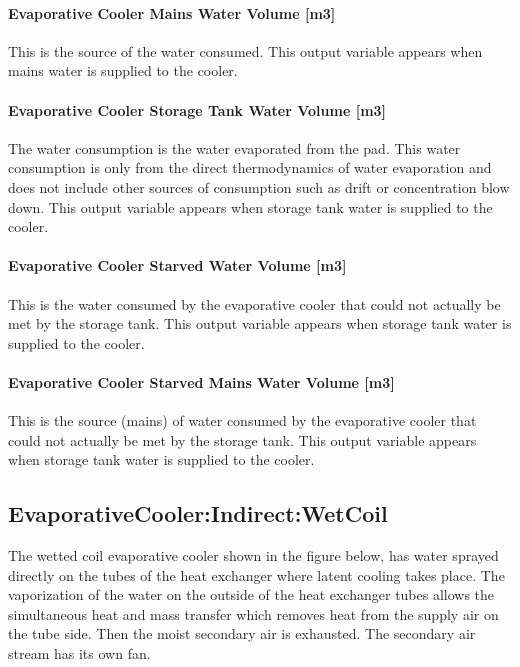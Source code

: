 \paragraph{Evaporative Cooler Mains Water Volume {[}m3{]}}\label{evaporative-cooler-mains-water-volume-m3-2}

This is the source of the water consumed. This output variable appears when mains water is supplied to the cooler.

\paragraph{Evaporative Cooler Storage Tank Water Volume {[}m3{]}}\label{evaporative-cooler-storage-tank-water-volume-m3-2}

The water consumption is the water evaporated from the pad. This water consumption is only from the direct thermodynamics of water evaporation and does not include other sources of consumption such as drift or concentration blow down. This output variable appears when storage tank water is supplied to the cooler.

\paragraph{Evaporative Cooler Starved Water Volume {[}m3{]}}\label{evaporative-cooler-starved-water-volume-m3-2}

This is the water consumed by the evaporative cooler that could not actually be met by the storage tank. This output variable appears when storage tank water is supplied to the cooler.

\paragraph{Evaporative Cooler Starved Mains Water Volume {[}m3{]}}\label{evaporative-cooler-starved-mains-water-volume-m3-2}

This is the source (mains) of water consumed by the evaporative cooler that could not actually be met by the storage tank. This output variable appears when storage tank water is supplied to the cooler.

\subsection{EvaporativeCooler:Indirect:WetCoil}\label{evaporativecoolerindirectwetcoil}

The wetted coil evaporative cooler shown in the figure below, has water sprayed directly on the tubes of the heat exchanger where latent cooling takes place. The vaporization of the water on the outside of the heat exchanger tubes allows the simultaneous heat and mass transfer which removes heat from the supply air on the tube side. Then the moist secondary air is exhausted. The secondary air stream has its own fan.

